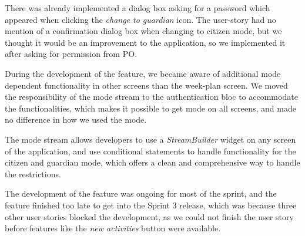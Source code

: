 There was already implemented a dialog box asking for a password which appeared when clicking the \textit{change to guardian} icon. The user-story had no mention of a confirmation dialog box when changing to citizen mode, but we thought it would be an improvement to the application, so we implemented it after asking for permission from \gls{PO}.

During the development of the feature, we became aware of additional mode dependent functionality in other screens than the week-plan screen.  We moved the responsibility of the mode stream to the authentication \gls{bloc} to accommodate the functionalities, which makes it possible to get mode on all screens, and made no difference in how we used the mode.

The mode stream allows developers to use a \textit{StreamBuilder} widget on any screen of the application, and use conditional statements to handle functionality for the citizen and guardian mode, which offers a clean and comprehensive way to handle the restrictions.

The development of the feature was ongoing for most of the sprint, and the feature finished too late to get into the Sprint 3 release, which was because three other user stories blocked the development, as we could not finish the user story before features like the \textit{new activities} button were available.
